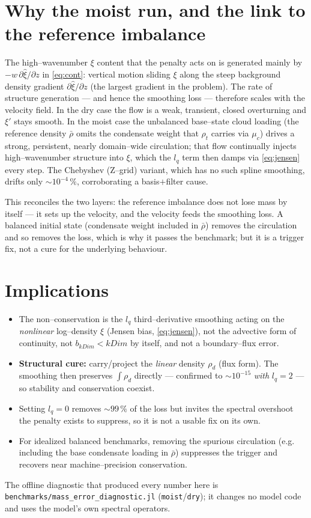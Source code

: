\documentclass[11pt]{article}
\newcommand{\rd}{\rho_d}
\newcommand{\xhat}{\hat{\xi}}
\begin{document}
\section{Why the moist run, and the link to the reference imbalance}

The high--wavenumber $\xi$ content that the penalty acts on is generated mainly by
$-w\,\partial\xhat/\partial z$ in \eqref{eq:cont}: vertical motion sliding $\xi$
along the steep background density gradient $\partial\xhat/\partial z$ (the
largest gradient in the problem). The rate of structure generation --- and hence
the smoothing loss --- therefore scales with the velocity field. In the dry case
the flow is a weak, transient, closed overturning and $\xi'$ stays smooth. In the
moist case the unbalanced base--state cloud loading (the reference density
$\bar\rho$ omits the condensate weight that $\rho_t$ carries via $\mu_c$) drives a
strong, persistent, nearly domain--wide circulation; that flow continually
injects high--wavenumber structure into $\xi$, which the $l_q$ term then damps via
\eqref{eq:jensen} every step. The Chebyshev (Z--grid) variant, which has no such
spline smoothing, drifts only $\sim10^{-4}\,\%$, corroborating a basis$+$filter
cause.

This reconciles the two layers: the reference imbalance does not lose mass by
itself --- it sets up the velocity, and the velocity feeds the smoothing loss. A
balanced initial state (condensate weight included in $\bar\rho$) removes the
circulation and so removes the loss, which is why it passes the benchmark; but it
is a trigger fix, not a cure for the underlying behaviour.

\section{Implications}

\begin{itemize}
\item The non--conservation is the $l_q$ third--derivative smoothing acting on the
\emph{nonlinear} log--density $\xi$ (Jensen bias, \eqref{eq:jensen}), not the
advective form of continuity, not $b_{kDim}<kDim$ by itself, and not a
boundary--flux error.
\item \textbf{Structural cure:} carry/project the \emph{linear} density $\rd$
(flux form). The smoothing then preserves $\int\rd$ directly --- confirmed to
$\sim10^{-15}$ \emph{with} $l_q=2$ --- so stability and conservation coexist.
\item Setting $l_q=0$ removes $\sim99\,\%$ of the loss but invites the spectral
overshoot the penalty exists to suppress, so it is not a usable fix on its own.
\item For idealized balanced benchmarks, removing the spurious circulation (e.g.
including the base condensate loading in $\bar\rho$) suppresses the trigger and
recovers near machine--precision conservation.
\end{itemize}

The offline diagnostic that produced every number here is
\verb|benchmarks/mass_error_diagnostic.jl| (\verb|moist|/\verb|dry|); it changes
no model code and uses the model's own spectral operators.
\end{document}
